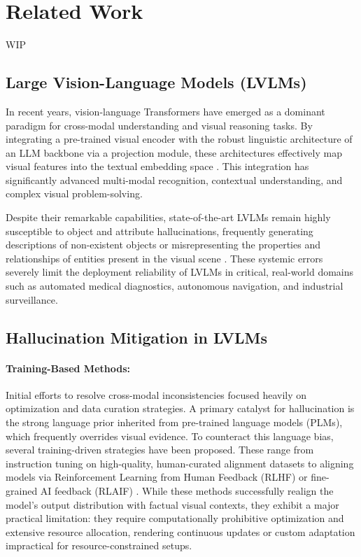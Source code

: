 \section{Related Work}
WIP
\subsection{Large Vision-Language Models (LVLMs)}
In recent years, vision-language Transformers have emerged as a dominant paradigm for cross-modal understanding and visual reasoning tasks. By integrating a pre-trained visual encoder with the robust linguistic architecture of an LLM backbone via a projection module, these architectures effectively map visual features into the textual embedding space \cite{???}. This integration has significantly advanced multi-modal recognition, contextual understanding, and complex visual problem-solving. 

Despite their remarkable capabilities, state-of-the-art LVLMs remain highly susceptible to object and attribute hallucinations, frequently generating descriptions of non-existent objects or misrepresenting the properties and relationships of entities present in the visual scene \cite{hallucination_survey?}. These systemic errors severely limit the deployment reliability of LVLMs in critical, real-world domains such as automated medical diagnostics, autonomous navigation, and industrial surveillance.

\subsection{Hallucination Mitigation in LVLMs}

\paragraph{Training-Based Methods:} 
Initial efforts to resolve cross-modal inconsistencies focused heavily on optimization and data curation strategies. A primary catalyst for hallucination is the strong language prior inherited from pre-trained language models (PLMs), which frequently overrides visual evidence. To counteract this language bias, several training-driven strategies have been proposed. These range from instruction tuning on high-quality, human-curated alignment datasets to aligning models via Reinforcement Learning from Human Feedback (RLHF) or fine-grained AI feedback (RLAIF) \cite{rlhf_sun, fgaif_jing}. While these methods successfully realign the model's output distribution with factual visual contexts, they exhibit a major practical limitation: they require computationally prohibitive optimization and extensive resource allocation, rendering continuous updates or custom adaptation impractical for resource-constrained setups.

